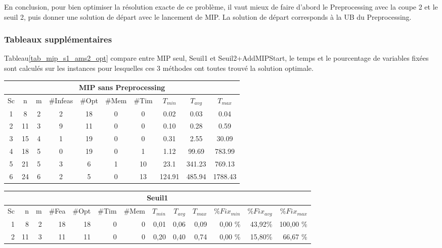\documentclass[twoside,fleqn]{EPURapport}
\begin{document}
En conclusion, pour bien optimiser la résolution exacte de ce problème, il vaut mieux de faire d'abord le Preprocessing avec la coupe 2 et le seuil 2, puis donner une solution de départ avec le lancement de MIP. La solution de départ corresponds à la UB du Preprocessing.

\subsubsection{Tableaux supplémentaires}

Tableau\ref{tab_mip_s1_ams2_opt} compare entre MIP seul, Seuil1 et Seuil2+AddMIPStart, le temps et le pourcentage de variables fixées sont calculés sur les instances pour lesquelles ces 3 méthodes ont toutes trouvé la solution optimale. 


\begin{table}[h]
    \centering
    \begin{tabular}{|c|c|c|c|c|c|c|c|c|c|} 
    	\hline
    	\multicolumn{10}{|c|}{MIP sans Preprocessing}\\ \hline
Sc &	n	&m & \#Infeas & \#Opt	& \#Mem & \#Tim & $T_{min}$ & $T_{avg}$	& $T_{max}$ \\ \hline
1 &    8    &2 & 2 & 18 & 0 & 0 &  0.02 &  0.03 &  0.04 \\ \hline
2 &    11   &3 & 9 & 11 & 0 & 0 &  0.10 &  0.28 & 0.59  \\ \hline
3 &    15   &4 & 1 & 19 & 0 & 0 &  0.31 &  2.55 &  30.09 \\ \hline
4 &	   18	&5 & 0 & 19 & 0 & 1 &  1.12 &   99.69&  783.99 \\ \hline
5 &	   21	&5 & 3 & 6 & 1 & 10 &  23.1 &  341.23 &  769.13 \\ \hline
6 &	   24	&6 & 2 & 5 & 0 & 13 &  124.91 &  485.94 &  1788.43 \\	\hline
    \end{tabular}
\vspace{1em}
    \begin{tabular}{|r|r|r|r|r|r|r|r|r|r|r|r|r|}
    	\hline
    	\multicolumn{13}{|c|}{Seuil1}\\ \hline
Sc &	n	&m	&\#Fea	&\#Opt	&\#Tim &\#Mem	&$T_{min}$ & $T_{avg}$	& $T_{max}$ & $\%Fix_{min}$ & $\%Fix_{avg}$	& $\%Fix_{max}$ \\ \hline
1&  	8	& 2	& 18	& 18	& 0	& 0	 & 0,01	    	&0,06	&0,09		&0,00	\%&43,92\%&	100,00 \%    \\ \hline
2& 	    11	& 3	& 11	& 11	& 0	& 0	 & 0,20	    	&0,40	&0,74		&0,00	\%&15,80\%&	66,67  \%     \\ \hline

\end{tabular}
\end{table}
\end{document}
